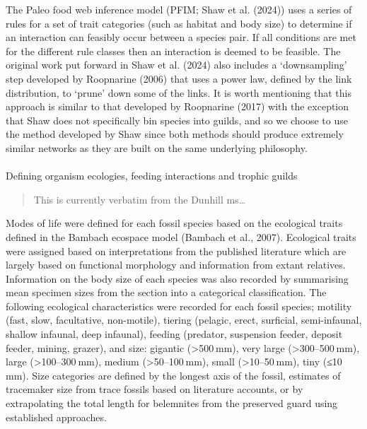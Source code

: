 \documentclass[
]{article}
\makeatletter
\let\oldparagraph\paragraph
\renewcommand{\paragraph}{
    \@ifstar
      \xxxParagraphStar
      \xxxParagraphNoStar
  }
\newcommand{\xxxParagraphStar}[1]{\oldparagraph*{#1}\mbox{}}
\newcommand{\xxxParagraphNoStar}[1]{\oldparagraph{#1}\mbox{}}
\makeatother
\begin{document}
The Paleo food web inference model (PFIM; Shaw et al. (2024)) uses a
series of rules for a set of trait categories (such as habitat and body
size) to determine if an interaction can feasibly occur between a
species pair. If all conditions are met for the different rule classes
then an interaction is deemed to be feasible. The original work put
forward in Shaw et al. (2024) also includes a `downsampling' step
developed by Roopnarine (2006) that uses a power law, defined by the
link distribution, to `prune' down some of the links. It is worth
mentioning that this approach is similar to that developed by Roopnarine
(2017) with the exception that Shaw does not specifically bin species
into guilds, and so we choose to use the method developed by Shaw since
both methods should produce extremely similar networks as they are built
on the same underlying philosophy.

\paragraph{Defining organism ecologies, feeding interactions and trophic
guilds}\label{defining-organism-ecologies-feeding-interactions-and-trophic-guilds}

\begin{quote}
This is currently verbatim from the Dunhill ms\ldots{}
\end{quote}

Modes of life were defined for each fossil species based on the
ecological traits defined in the Bambach ecospace model (Bambach et al.,
2007). Ecological traits were assigned based on interpretations from the
published literature which are largely based on functional morphology
and information from extant relatives. Information on the body size of
each species was also recorded by summarising mean specimen sizes from
the section into a categorical classification. The following ecological
characteristics were recorded for each fossil species; motility (fast,
slow, facultative, non-motile), tiering (pelagic, erect, surficial,
semi-infaunal, shallow infaunal, deep infaunal), feeding (predator,
suspension feeder, deposit feeder, mining, grazer), and size: gigantic
(\textgreater500 mm), very large (\textgreater300--500 mm), large
(\textgreater100--300 mm), medium (\textgreater50--100 mm), small
(\textgreater10--50 mm), tiny (≤10 mm). Size categories are defined by
the longest axis of the fossil, estimates of tracemaker size from trace
fossils based on literature accounts, or by extrapolating the total
length for belemnites from the preserved guard using established
approaches.
\end{document}

